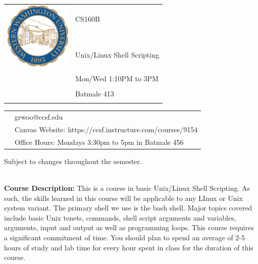 \documentclass[11pt]{article}
\begin{document}
\begin{tabular}{ l l }
  \multirow{3}{*}{\includegraphics[height=1.25in,width=1.25in]{logo_wwu.png}} & \LARGE CS160B \\\\
                                                                             & \LARGE Unix/Linux Shell Scripting \\\\
  & \LARGE Mon/Wed 1:10PM to 3PM \\\\
  & \LARGE Batmale 413\\\\
\end{tabular}
\vspace{10mm}

\begin{tabular}{ l l }
  & \large grwoo@ccsf.edu \\
  & \large Canvas Website: https://ccsf.instructure.com/courses/9154\\
  & \large Office Hours:  Mondays 3:30pm to 5pm in Batmale 456\\
\end{tabular}
\vspace{5mm}
\begin{center} Subject to changes throughout the semester.\\
\end{center}

\textbf {\large \\ Course Description:} This is a course in basic Unix/Linux Shell Scripting. As such, the skills learned in this course will be applicable to any LInux or Unix system variant. The primary shell we use is the bash shell. Major topics covered include basic Unix tenets, commands, shell script arguments and variables, arguments, input and output as well as programming loops. This course requires a significant commitment of time. You should plan to spend an average of 2-5 hours of study and lab time for every hour spent in class for the duration of this course.\\
\end{document}
